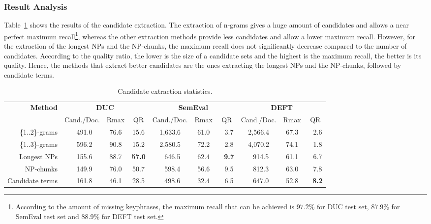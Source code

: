     \subsubsection{Result Analysis}
    \label{subsubsec:candidate_extraction_result_analysis}
      Table~\ref{tab:candidate_extraction_statistics} shows the results of the
      candidate extraction. The extraction  of n-grams gives a huge amount of
      candidates and allows a near perfect maximum recall\footnote{According to
      the amount of missing keyphrases, the maximum recall that can be achieved
      is 97.2\% for DUC test set, 87.9\% for SemEval test set and 88.9\% for
      DEFT  test set.}, whereas the other extraction methods provide less
      candidates and allow a lower maximum recall. However, for the extraction
      of the longest NPs and the NP-chunks, the maximum recall does not
      significantly decrease compared to the number of candidates. According to
      the quality ratio, the lower is the size of a candidate sets and the
      highest is the maximum recall, the better is its quality. Hence, the
      methods that extract better candidates are the ones extracting the longest
      NPs and the NP-chunks, followed by candidate terms.
      \begin{table}
        \centering
        \begin{tabular}{r@{~~}c@{~~}c@{~~}c@{~~}c@{~~}c@{~~}c@{~~}c@{~~}c@{~~}c}
          \toprule
          \multirow{2}{*}[-2pt]{\textbf{Method}} & \multicolumn{3}{c}{\textbf{DUC}} & \multicolumn{3}{c}{\textbf{SemEval}} & \multicolumn{3}{c}{\textbf{DEFT}}\\
          \cmidrule(r){2-4}\cmidrule(r){5-7}\cmidrule{8-10}
          & Cand./Doc. & Rmax & QR & Cand./Doc. & Rmax & QR & Cand./Doc. & Rmax &
          QR\\
          \midrule
          \{1..2\}-grams & $~~~$491.0 & 76.6 & 15.6 & 1,633.6 & 61.0 & $~~~$3.7 & 2,566.4 & 67.3 & $~~~$2.6\\
          \{1..3\}-grams & $~~~$596.2 & 90.8 & 15.2 & 2,580.5 & 72.2 & $~~~$2.8 & 4,070.2 & 74.1 & $~~~$1.8\\
          Longest NPs & $~~~$155.6 & 88.7 & \textbf{57.0} & $~~~$646.5 & 62.4 & \textbf{$~~~$9.7} & $~~~$914.5 & 61.1 & $~~~$6.7\\
          NP-chunks & $~~~$149.9 & 76.0 & 50.7 & $~~~$598.4 & 56.6 & $~~~$9.5 & $~~~$812.3 & 63.0 & $~~~$7.8\\
          Candidate terms & $~~~$161.8 & 46.1 & 28.5 & $~~~$498.6 & 32.4 & $~~~$6.5 & $~~~$647.0 & 52.8 & \textbf{$~~~$8.2}\\
          \bottomrule
        \end{tabular}
        \caption{Candidate extraction statistics.
                 \label{tab:candidate_extraction_statistics}}
      \end{table}
      
